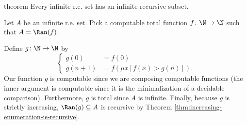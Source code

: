 \documentclass[class=article, crop=false]{standalone}
\begin{document}
\begin{result}{theorem}
  Every infinite r.e. set has an infinite recursive subset.
\end{result}
\begin{pf}
  Let $A$ be an infinite r.e. set. Pick a computable total function $f\colon \N \to \N$ such that $A = \Ran(f)$.

  Define $g\colon \N \to \N$ by
    \[
      \begin{cases}
        g(0) &= f(0) \\
        g(n+1) &= f(\mu x [f(x) > g(n)]).
      \end{cases}
    \]
  Our function $g$ is computable since we are composing computable functions (the inner argument is computable since it is the minimalization of a decidable comparison). Furthermore, $g$ is total since $A$ is infinite. Finally, because $g$ is strictly increasing, $\Ran(g) \subseteq A$ is recursive by Theorem \ref{thm:increasing-enumeration-is-recursive}. 
\end{pf}
\end{document}
